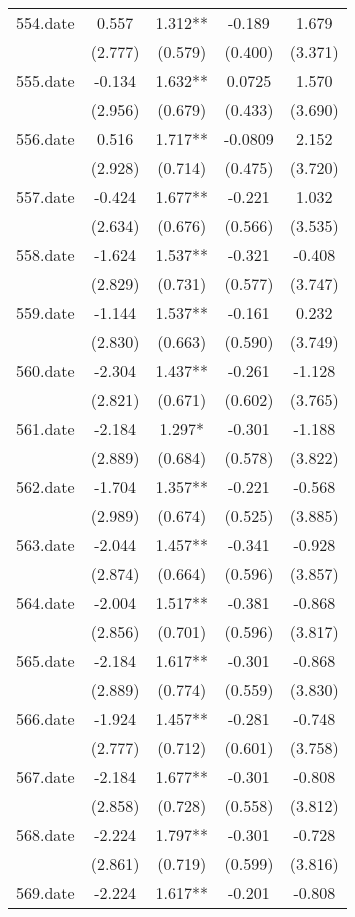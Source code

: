 \documentclass[]{article}
\begin{document}
\begin{tabular}{lcccc}
554.date & 0.557 & 1.312** & -0.189 & 1.679 \\
 & (2.777) & (0.579) & (0.400) & (3.371) \\
555.date & -0.134 & 1.632** & 0.0725 & 1.570 \\
 & (2.956) & (0.679) & (0.433) & (3.690) \\
556.date & 0.516 & 1.717** & -0.0809 & 2.152 \\
 & (2.928) & (0.714) & (0.475) & (3.720) \\
557.date & -0.424 & 1.677** & -0.221 & 1.032 \\
 & (2.634) & (0.676) & (0.566) & (3.535) \\
558.date & -1.624 & 1.537** & -0.321 & -0.408 \\
 & (2.829) & (0.731) & (0.577) & (3.747) \\
559.date & -1.144 & 1.537** & -0.161 & 0.232 \\
 & (2.830) & (0.663) & (0.590) & (3.749) \\
560.date & -2.304 & 1.437** & -0.261 & -1.128 \\
 & (2.821) & (0.671) & (0.602) & (3.765) \\
561.date & -2.184 & 1.297* & -0.301 & -1.188 \\
 & (2.889) & (0.684) & (0.578) & (3.822) \\
562.date & -1.704 & 1.357** & -0.221 & -0.568 \\
 & (2.989) & (0.674) & (0.525) & (3.885) \\
563.date & -2.044 & 1.457** & -0.341 & -0.928 \\
 & (2.874) & (0.664) & (0.596) & (3.857) \\
564.date & -2.004 & 1.517** & -0.381 & -0.868 \\
 & (2.856) & (0.701) & (0.596) & (3.817) \\
565.date & -2.184 & 1.617** & -0.301 & -0.868 \\
 & (2.889) & (0.774) & (0.559) & (3.830) \\
566.date & -1.924 & 1.457** & -0.281 & -0.748 \\
 & (2.777) & (0.712) & (0.601) & (3.758) \\
567.date & -2.184 & 1.677** & -0.301 & -0.808 \\
 & (2.858) & (0.728) & (0.558) & (3.812) \\
568.date & -2.224 & 1.797** & -0.301 & -0.728 \\
 & (2.861) & (0.719) & (0.599) & (3.816) \\
569.date & -2.224 & 1.617** & -0.201 & -0.808 \\

\end{tabular}
\end{document}
